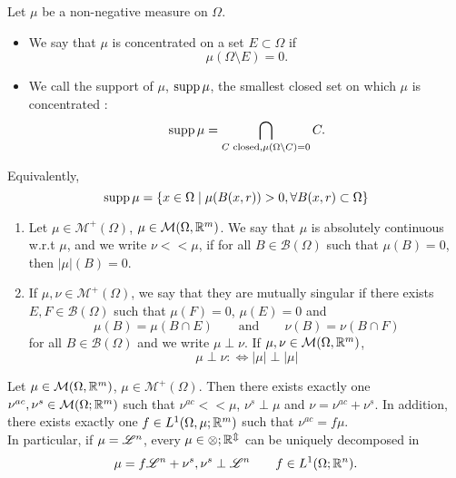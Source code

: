 \begin{definition}
Let $\mu$ be a non-negative measure on $\Omega$.
\begin{itemize}
\item We say that $\mu$ is concentrated on a set $E \subset \Omega$ if  
\[
\mu(\Omega \setminus E) = 0.
\]
\item We call the support of $\mu$, $\operatorname{supp} \mu$, the smallest closed set on
which $\mu$ is concentrated :
\[
\operatorname{supp} \mu = \bigcap_{C \text{ closed}, \mu (\Omega\setminus C) = 0} C.
\]
\end{itemize}
\end{definition}
\begin{exercise}
Equivalently, 
\[
\operatorname{supp} \mu = \{x \in \Omega \mid \mu(B(x,r)) > 0, \forall B(x,r) \subset \Omega\}
\]
\end{exercise}

\begin{definition}
\begin{enumerate}[1.]
\item Let $\mu \in \mathcal{M}^+(\Omega)$, $\mu \in \mathcal{M}(\Omega,\mathbb{R}^m)$. We say
that $\mu$ is absolutely continuous w.r.t $\mu$, and we write $\nu << \mu$, if
for all $B \in \mathcal{B}(\Omega)$ such that $\mu(B) = 0$, then $|\mu|(B) = 0$.
\item If $\mu,\nu \in \mathcal{M}^+(\Omega)$, we say that they are mutually
singular if there exists $E,F \in \mathcal{B}(\Omega)$ such that $\mu(F) =0$,
$\mu(E) = 0$ and 
\[
\mu(B) = \mu (B\cap E) \qquad \text{and} \qquad
\nu(B) = \nu(B \cap F)
\]
for all $B \in \mathcal{B}(\Omega)$ and we write $\mu \perp \nu$. If $\mu,\nu
\in \mathcal{M}(\Omega,\mathbb{R}^m)$, 
\[
\mu \perp \nu :\iff |\mu| \perp |\mu|
\]
\end{enumerate}
\end{definition}

\begin{theorem}
Let $\mu \in \mathcal{M}(\Omega,\mathbb{R}^m)$, $\mu \in \mathcal{M}^+(\Omega)$. Then
there exists exactly one $\nu^{ac},\nu^{s} \in \mathcal{M}(\Omega; \mathbb{R}^m)$ such
that $\nu^{ac} << \mu$, $\nu^s \perp \mu$ and $\nu = \nu^{ac} + \nu^s$. In
addition, there exists exactly one $f\in L^1(\Omega,\mu;\mathbb{R}^m)$ such that
$\nu^{ac} = f\mu$.
\\
In particular, if $\mu = \mathscr{L}^{n}$, every $\mu \in \mathcal{\Omega;\mathbb{R}^m}$ can be
uniquely decomposed in
\[
\mu = f \mathscr{L}^{n} + \nu^s, \nu^s \perp \mathscr{L}^{n}
\qquad f\in L^1(\Omega; \mathbb{R}^n).
\]
\end{theorem}


